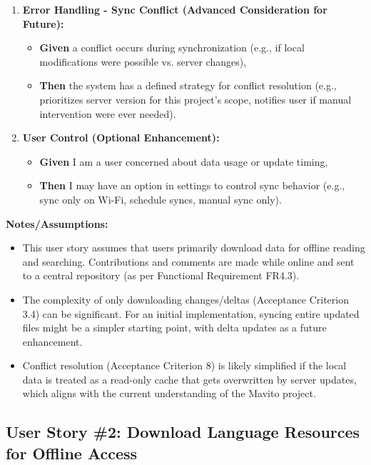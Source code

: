 \documentclass[12pt]{article}
\begin{document}
\begin{enumerate}
    \item \textbf{Error Handling - Sync Conflict (Advanced Consideration for Future):}
    \begin{itemize}
        \item \textbf{Given} a conflict occurs during synchronization (e.g., if local modifications were possible vs. server changes),
        \item \textbf{Then} the system has a defined strategy for conflict resolution (e.g., prioritizes server version for this project's scope, notifies user if manual intervention were ever needed).
    \end{itemize}

    \item \textbf{User Control (Optional Enhancement):}
    \begin{itemize}
        \item \textbf{Given} I am a user concerned about data usage or update timing,
        \item \textbf{Then} I may have an option in settings to control sync behavior (e.g., sync only on Wi-Fi, schedule syncs, manual sync only).
    \end{itemize}
\end{enumerate}

\vspace{1em}
\textbf{Notes/Assumptions:}
\begin{itemize}
    \item This user story assumes that users primarily download data for offline reading and searching. Contributions and comments are made while online and sent to a central repository (as per Functional Requirement FR4.3).
    \item The complexity of only downloading changes/deltas (Acceptance Criterion 3.4) can be significant. For an initial implementation, syncing entire updated files might be a simpler starting point, with delta updates as a future enhancement.
    \item Conflict resolution (Acceptance Criterion 8) is likely simplified if the local data is treated as a read-only cache that gets overwritten by server updates, which aligns with the current understanding of the Mavito project.
\end{itemize}



\subsection{User Story \#2: Download Language Resources for Offline Access}
\end{document}
